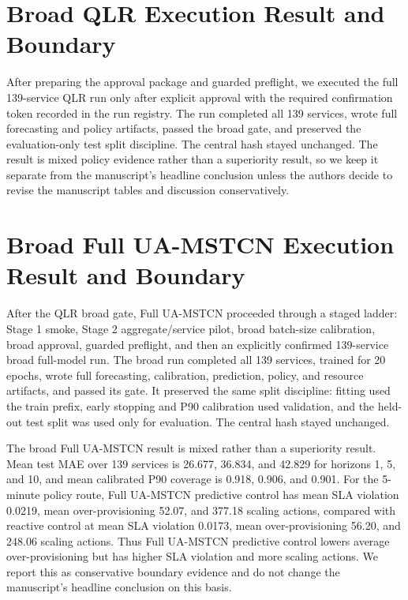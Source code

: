 \documentclass[11pt]{article}
\newcommand{\code}[1]{\texttt{\detokenize{#1}}}
\begin{document}
\section*{Broad QLR Execution Result and Boundary}

After preparing the approval package and guarded preflight, we executed the full 139-service QLR run only after explicit approval with the required confirmation token recorded in the run registry. The run completed all 139 services, wrote full forecasting and policy artifacts, passed the broad gate, and preserved the evaluation-only test split discipline. The central \code{metrics.csv} hash stayed unchanged. The result is mixed policy evidence rather than a superiority result, so we keep it separate from the manuscript's headline conclusion unless the authors decide to revise the manuscript tables and discussion conservatively.

\section*{Broad Full UA-MSTCN Execution Result and Boundary}

After the QLR broad gate, Full UA-MSTCN proceeded through a staged ladder: Stage 1 smoke, Stage 2 aggregate/service pilot, broad batch-size calibration, broad approval, guarded preflight, and then an explicitly confirmed 139-service broad full-model run. The broad run completed all 139 services, trained for 20 epochs, wrote full forecasting, calibration, prediction, policy, and resource artifacts, and passed its gate. It preserved the same split discipline: fitting used the train prefix, early stopping and P90 calibration used validation, and the held-out test split was used only for evaluation. The central \code{metrics.csv} hash stayed unchanged.

The broad Full UA-MSTCN result is mixed rather than a superiority result. Mean test MAE over 139 services is 26.677, 36.834, and 42.829 for horizons 1, 5, and 10, and mean calibrated P90 coverage is 0.918, 0.906, and 0.901. For the 5-minute policy route, Full UA-MSTCN predictive control has mean SLA violation 0.0219, mean over-provisioning 52.07, and 377.18 scaling actions, compared with reactive control at mean SLA violation 0.0173, mean over-provisioning 56.20, and 248.06 scaling actions. Thus Full UA-MSTCN predictive control lowers average over-provisioning but has higher SLA violation and more scaling actions. We report this as conservative boundary evidence and do not change the manuscript's headline conclusion on this basis.
\end{document}
